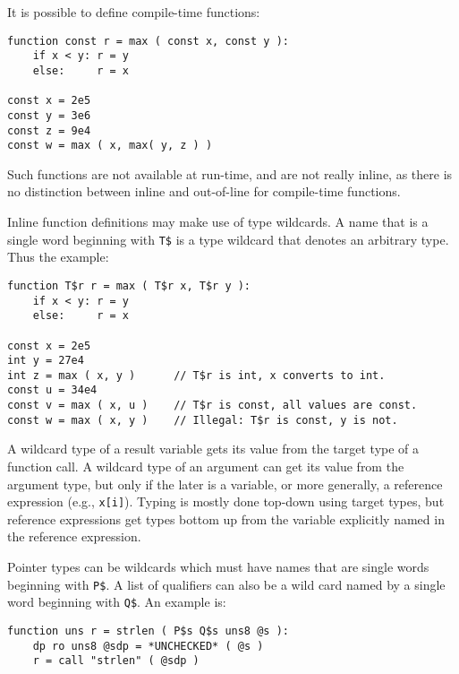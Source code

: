 \documentclass[12pt]{article}
\newenvironment{indpar}[1][0.3in]%
	{\begin{list}{}%
		     {\setlength{\itemsep}{0in}%
		      \setlength{\topsep}{0in}%
		      \setlength{\parsep}{1ex}%
		      \setlength{\labelwidth}{#1}%
		      \setlength{\leftmargin}{#1}%
		      \addtolength{\leftmargin}{\labelsep}}%
	 \item}%
	{\end{list}}
\begin{document}
It is possible to define compile-time functions:

\begin{indpar}\begin{verbatim}
function const r = max ( const x, const y ):
    if x < y: r = y
    else:     r = x

const x = 2e5
const y = 3e6
const z = 9e4
const w = max ( x, max( y, z ) )
\end{verbatim}\end{indpar}

Such functions are not available at run-time, and
are not really inline, as there is no
distinction between inline and out-of-line for compile-time functions.

Inline function definitions may make use of type wildcards.
A name that is a single word beginning with {\tt T\$}
is a type wildcard that denotes
an arbitrary type.  Thus the example:

\begin{indpar}\begin{verbatim}
function T$r r = max ( T$r x, T$r y ):
    if x < y: r = y
    else:     r = x

const x = 2e5
int y = 27e4
int z = max ( x, y )      // T$r is int, x converts to int.
const u = 34e4
const v = max ( x, u )    // T$r is const, all values are const.
const w = max ( x, y )    // Illegal: T$r is const, y is not.
\end{verbatim}\end{indpar}

A wildcard type of a result variable gets its value from the
target type of a function call.  A wildcard type of an argument
can get its value from the argument type, but only if the
later is a variable, or more generally, a reference expression
(e.g., {\tt x[i]}).
Typing is mostly done top-down using target types, but reference
expressions get types bottom up from the variable explicitly named
in the reference expression.

Pointer types can be wildcards which must have names that are
single words beginning with {\tt P\$}.  A list of qualifiers
can also be a wild card named by a single word beginning with
{\tt Q\$}.  An example is:

\begin{indpar}\begin{verbatim}
function uns r = strlen ( P$s Q$s uns8 @s ):
    dp ro uns8 @sdp = *UNCHECKED* ( @s )
    r = call "strlen" ( @sdp )
\end{verbatim}\end{indpar}
\end{document}
